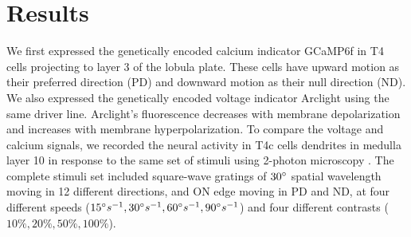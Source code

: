 \documentclass[9pt,lineno]{elife}
\begin{document}


\section{Results}

We first expressed the genetically encoded calcium indicator GCaMP6f \parencite{Chen2013} in T4 cells projecting to layer 3 of the lobula plate. These cells have upward motion as their preferred direction (PD) and downward motion as their null direction (ND). We also expressed the genetically encoded voltage indicator Arclight \parencite{Jin2012} using the same driver line. Arclight's fluorescence decreases with membrane depolarization and increases with membrane hyperpolarization. To compare the voltage and calcium signals,  we recorded the neural activity in T4c cells dendrites in medulla layer 10 in response to the same set of stimuli using 2-photon microscopy \parencite{Denk1990}. The complete stimuli set included square-wave gratings of $30\degree$ spatial wavelength moving in 12 different directions, and ON edge moving in PD and ND, at four different speeds ($15\degree s^{-1}, 30\degree s^{-1}, 60\degree s^{-1}, 90\degree s^{-1}$) and four different contrasts ($10\%, 20\%, 50\%, 100\%$).
\end{document}

